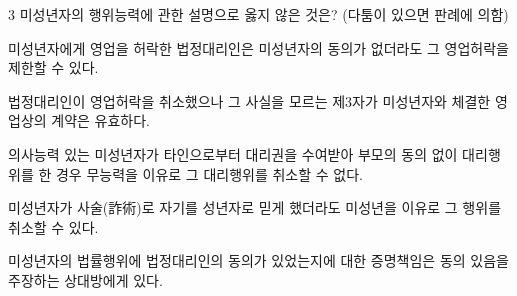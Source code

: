 \begin{question}{3}
미성년자의 행위능력에 관한 설명으로 옳지 않은 것은? (다툼이 있으면 판례에 의함)
\begin{choices}
  \item 미성년자에게 영업을 허락한 법정대리인은 미성년자의 동의가 없더라도 그 영업허락을 제한할 수 있다.
  \item 법정대리인이 영업허락을 취소했으나 그 사실을 모르는 제3자가 미성년자와 체결한 영업상의 계약은 유효하다.
  \item 의사능력 있는 미성년자가 타인으로부터 대리권을 수여받아 부모의 동의 없이 대리행위를 한 경우 무능력을 이유로 그 대리행위를 취소할 수 없다.
  \item 미성년자가 사술(詐術)로 자기를 성년자로 믿게 했더라도 미성년을 이유로 그 행위를 취소할 수 있다.
  \item 미성년자의 법률행위에 법정대리인의 동의가 있었는지에 대한 증명책임은 동의 있음을 주장하는 상대방에게 있다.
\end{choices}
\end{question}
